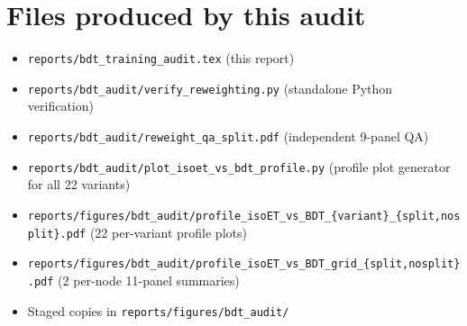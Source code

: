 \documentclass[11pt,a4paper]{article}
\begin{document}
\section*{Files produced by this audit}

\begin{itemize}
\item \texttt{reports/bdt\_training\_audit.tex} (this report)
\item \texttt{reports/bdt\_audit/verify\_reweighting.py} (standalone
  Python verification)
\item \texttt{reports/bdt\_audit/reweight\_qa\_split.pdf} (independent
  9-panel QA)
\item \texttt{reports/bdt\_audit/plot\_isoet\_vs\_bdt\_profile.py}
  (profile plot generator for all 22 variants)
\item \texttt{reports/figures/bdt\_audit/profile\_isoET\_vs\_BDT\_\{variant\}\_\{split,nosplit\}.pdf}
  (22 per-variant profile plots)
\item \texttt{reports/figures/bdt\_audit/profile\_isoET\_vs\_BDT\_grid\_\{split,nosplit\}.pdf}
  (2 per-node 11-panel summaries)
\item Staged copies in \texttt{reports/figures/bdt\_audit/}
\end{itemize}
\end{document}
